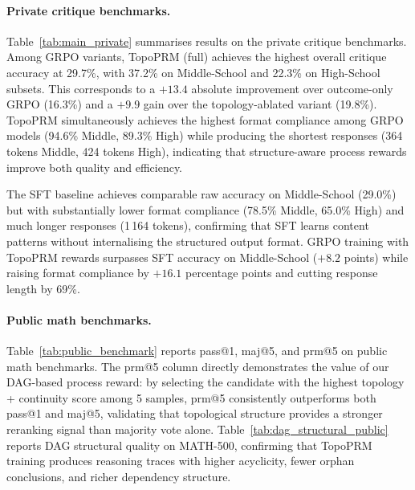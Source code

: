 

\paragraph{Private critique benchmarks.}
Table~\ref{tab:main_private} summarises results on the private critique benchmarks.
Among GRPO variants, TopoPRM (full) achieves the highest overall critique accuracy at 29.7\%, with 37.2\% on Middle-School and 22.3\% on High-School subsets.
This corresponds to a $+13.4$ absolute improvement over outcome-only GRPO (16.3\%) and a $+9.9$ gain over the topology-ablated variant (19.8\%).
TopoPRM simultaneously achieves the highest format compliance among GRPO models (94.6\% Middle, 89.3\% High) while producing the shortest responses (364 tokens Middle, 424 tokens High), indicating that structure-aware process rewards improve both quality and efficiency.

The SFT baseline achieves comparable raw accuracy on Middle-School (29.0\%) but with substantially lower format compliance (78.5\% Middle, 65.0\% High) and much longer responses (1\,164 tokens), confirming that SFT learns content patterns without internalising the structured output format.
GRPO training with TopoPRM rewards surpasses SFT accuracy on Middle-School ($+8.2$ points) while raising format compliance by $+16.1$ percentage points and cutting response length by 69\%.



\paragraph{Public math benchmarks.}
Table~\ref{tab:public_benchmark} reports pass@1, maj@5, and prm@5 on public math benchmarks.
The prm@5 column directly demonstrates the value of our DAG-based process reward:
by selecting the candidate with the highest topology + continuity score among 5 samples,
prm@5 consistently outperforms both pass@1 and maj@5, validating that
topological structure provides a stronger reranking signal than majority vote alone.
Table~\ref{tab:dag_structural_public} reports DAG structural quality on MATH-500,
confirming that TopoPRM training produces reasoning traces with higher acyclicity,
fewer orphan conclusions, and richer dependency structure.





